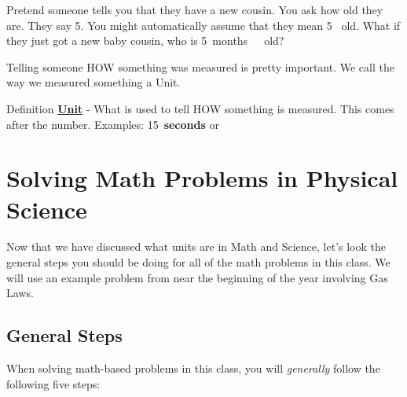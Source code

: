 \documentclass[../../main.tex]{subfiles}
\begin{document}
Pretend someone tells you that they have a new cousin.  You ask how old they are.  They say 5.  You might automatically assume that they mean \num{5}~\unit{\years} old.  What if they just got a new baby cousin, who is \qty{5}{months\ old}?

Telling someone HOW something was measured is pretty important.  We call the way we measured something a Unit.

\begin{displayquote}
	\begin{boxBox}{Definition}
		{\large\textbf{\underline{Unit}}} - What is used to tell HOW something is measured.  This comes after the number. Examples: \qty{15}{\textbf{seconds}} or
	\end{boxBox}
\end{displayquote}

\section{Solving Math Problems in Physical Science}

Now that we have discussed what units are in Math and Science, let's look the general steps you should be doing for all of the math problems in this class.  We will use an example problem from near the beginning of the year involving Gas Laws.


\subsection{General Steps}
When solving math-based problems in this class, you will \emph{generally} follow the following five steps:
\end{document}
